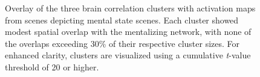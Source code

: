 \begin{figure}[!ht]
	\centering
	\caption{Overlay of the three brain correlation clusters with activation maps from scenes depicting mental state scenes. Each cluster showed modest spatial overlap with the mentalizing network, with none of the overlaps exceeding 30\% of their respective cluster sizes. For enhanced clarity, clusters are visualized using a cumulative \textit{t}-value threshold of 20 or higher.}
    \vspace*{-10pt}
	\label{fig:isc-fmri-overlap}
\end{figure}

